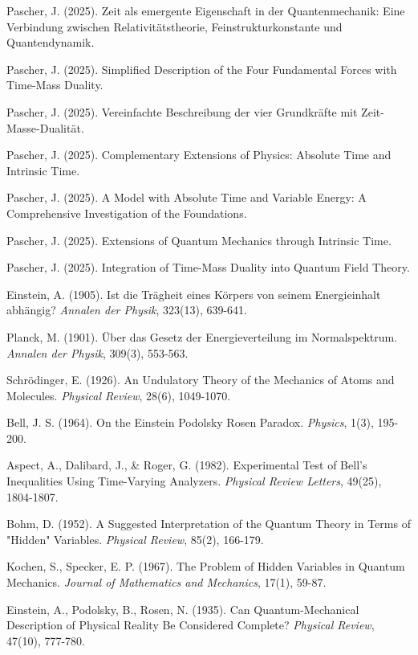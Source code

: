 \documentclass[12pt,a4paper]{article}  %
\begin{document}
		\begin{thebibliography}{99}
		 Pascher, J. (2025). Zeit als emergente Eigenschaft in der Quantenmechanik: Eine Verbindung zwischen Relativitätstheorie, Feinstrukturkonstante und Quantendynamik.
		
		 Pascher, J. (2025). Simplified Description of the Four Fundamental Forces with Time-Mass Duality.
		
		 Pascher, J. (2025). Vereinfachte Beschreibung der vier Grundkräfte mit Zeit-Masse-Dualität.
		
		 Pascher, J. (2025). Complementary Extensions of Physics: Absolute Time and Intrinsic Time.
		
		 Pascher, J. (2025). A Model with Absolute Time and Variable Energy: A Comprehensive Investigation of the Foundations.
		
		 Pascher, J. (2025). Extensions of Quantum Mechanics through Intrinsic Time.
		
		 Pascher, J. (2025). Integration of Time-Mass Duality into Quantum Field Theory.
		
		 Einstein, A. (1905). Ist die Trägheit eines Körpers von seinem Energieinhalt abhängig? \textit{Annalen der Physik}, 323(13), 639-641.
		
		 Planck, M. (1901). Über das Gesetz der Energieverteilung im Normalspektrum. \textit{Annalen der Physik}, 309(3), 553-563.
		
		 Schrödinger, E. (1926). An Undulatory Theory of the Mechanics of Atoms and Molecules. \textit{Physical Review}, 28(6), 1049-1070.
		
		 Bell, J. S. (1964). On the Einstein Podolsky Rosen Paradox. \textit{Physics}, 1(3), 195-200.
		
		 Aspect, A., Dalibard, J., \& Roger, G. (1982). Experimental Test of Bell's Inequalities Using Time-Varying Analyzers. \textit{Physical Review Letters}, 49(25), 1804-1807.
		
		 Bohm, D. (1952). A Suggested Interpretation of the Quantum Theory in Terms of "Hidden" Variables. \textit{Physical Review}, 85(2), 166-179.
		
		 Kochen, S., Specker, E. P. (1967). The Problem of Hidden Variables in Quantum Mechanics. \textit{Journal of Mathematics and Mechanics}, 17(1), 59-87.
		
		 Einstein, A., Podolsky, B., Rosen, N. (1935). Can Quantum-Mechanical Description of Physical Reality Be Considered Complete? \textit{Physical Review}, 47(10), 777-780.
		\end{thebibliography}
		
	
\end{document}
